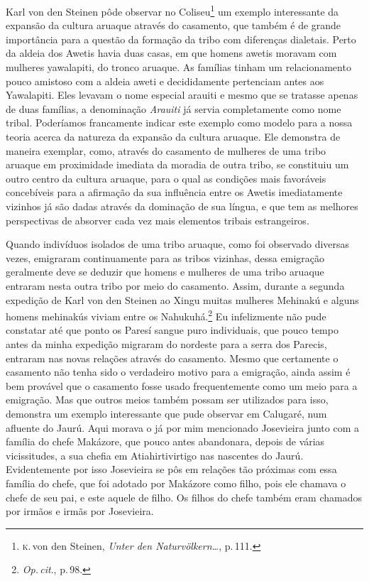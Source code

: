 Karl von den Steinen pôde observar no Coliseu\footnote{\textsc{k}.\,von den
  Steinen, \textit{Unter den Naturvölkern\ldots}, p.\,111.} um
exemplo interessante da expansão da cultura aruaque através do
casamento, que também é de grande importância para a questão da formação
da tribo com diferenças dialetais. Perto da aldeia dos Awetis havia duas
casas, em que homens awetis moravam com mulheres yawalapiti, do tronco
aruaque. As famílias tinham um relacionamento pouco amistoso com a
aldeia aweti e decididamente pertenciam antes aos Yawalapiti. Eles
levavam o nome especial arauiti e mesmo que se tratasse apenas de duas
famílias, a denominação \textit{Arauiti} já servia completamente como nome
tribal. Poderíamos francamente indicar este exemplo como modelo para a
nossa teoria acerca da natureza da expansão da cultura aruaque. Ele
demonstra de maneira exemplar, como, através do casamento de mulheres de
uma tribo aruaque em proximidade imediata da moradia de outra tribo, se
constituiu um outro centro da cultura aruaque, para o qual as condições
mais favoráveis concebíveis para a afirmação da sua influência entre os Awetis 
imediatamente vizinhos já são dadas através da dominação
de sua língua, e que tem as melhores perspectivas de absorver cada vez
mais elementos tribais estrangeiros.

Quando indivíduos isolados de uma tribo aruaque, como foi observado
diversas vezes, emigraram continuamente para as tribos vizinhas, dessa
emigração geralmente deve se deduzir que homens e mulheres de uma tribo
aruaque entraram nesta outra tribo por meio do casamento. Assim, durante
a segunda expedição de Karl von den Steinen ao Xingu muitas mulheres
Mehinakú e alguns homens mehinakús viviam entre os Nahukuhá.\footnote{\textit{Op.\,cit}., p.\,98.} Eu infelizmente não pude constatar até que ponto os
Paresí sangue puro individuais, que pouco tempo antes da minha expedição
migraram do nordeste para a serra dos Parecis, entraram nas novas
relações através do casamento. Mesmo que certamente o casamento não
tenha sido o verdadeiro motivo para a emigração, ainda assim é bem
provável que o casamento fosse usado frequentemente como um meio para a
emigração. Mas que outros meios também possam ser utilizados para isso,
demonstra um exemplo interessante que pude observar em Calugaré, num
afluente do Jaurú. Aqui morava o já por mim mencionado Josevieira junto
com a família do chefe Makázore, que pouco antes abandonara, depois de
várias vicissitudes, a sua chefia em Atiahirtivirtigo nas nascentes do
Jaurú. Evidentemente por isso Josevieira se pôs em relações tão
próximas com essa família do chefe, que foi adotado por Makázore como
filho, pois ele chamava o chefe de seu pai, e este aquele de filho. Os
filhos do chefe também eram chamados por irmãos e irmãs por Josevieira.

